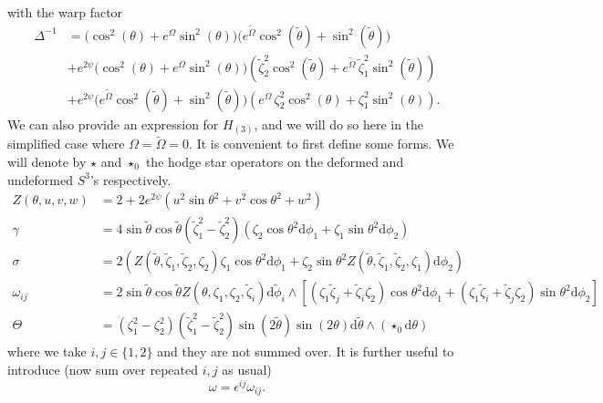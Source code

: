 \documentclass[a4paper, 11pt]{article}
\numberwithin{equation}{section}
\newcommand{\ts}[1]{\widetilde{#1}}
\newcommand{\+}{\oplus}
\renewcommand{\d}{\ensuremath{\mathrm{d}}\xspace}
\begin{document}
with the warp factor
\begin{equation}
	\begin{aligned}
	\Delta^{-1} &= \Big(\cos^{2}(\theta)+e^{\Omega}\sin^{2}(\theta)\Big)\Big(e^{\ts{\Omega}}\cos^{2}(\ts{\theta})+\sin^{2}(\ts{\theta})\Big)\\
	&+e^{2\psi}\Big(\cos^{2}(\theta)+e^{\Omega}\sin^{2}(\theta)\Big)\left(\ts{\zeta}_{2}^{2}\cos^{2}(\ts{\theta})+e^{\ts{\Omega}}\,\ts{\zeta}_{1}^{2}\sin^{2}(\ts{\theta})\right)\\
	&+e^{2\psi}\Big(e^{\ts{\Omega}}\cos^{2}(\ts{\theta})+\sin^{2}(\ts{\theta})\Big)\left(e^{\Omega}\,\zeta_{2}^{2}\cos^{2}(\theta)+\zeta_{1}^{2}\sin^{2}(\theta)\right).
	\end{aligned}
\end{equation}
We can also provide an expression for $H_{(3)}$, and we will do so here in the simplified case where $\Omega=\tilde\Omega=0$. It is convenient to first define some forms. We will denote by $\star$ and $\star_0$ the hodge star operators on the deformed and undeformed $S^3$'s respectively.
\begin{equation}\label{eq:forms}
	\begin{split}
		Z(\theta,u,v,w)&=2+2e^{2\psi}(u^2\sin \theta^2+v^2\cos \theta^2+w^2)\\
		\gamma&=4\sin\tilde\theta\cos\tilde \theta(\tilde{\zeta}_1^2-\tilde{\zeta}_2 ^2)\left(\zeta_2\cos \theta ^2\d \phi _1+\zeta _1\sin\theta ^2\d\phi _2\right)\\
		\sigma&=2\left(	Z(\tilde\theta,\tilde{\zeta}_1,\tilde{\zeta}_2,\zeta_2)\zeta_1\cos \theta ^2\d \phi _1+\zeta _2\sin\theta ^2Z(\tilde\theta,\tilde{\zeta}_1,\tilde{\zeta}_2,\zeta_1)\d\phi _2\right)\\
		\omega_{ij} &=2\sin\tilde\theta \cos\tilde\theta Z(\theta,\zeta_1,\zeta_2,\tilde\zeta _i)\d \tilde \phi _i\wedge \left [(\zeta _1\tilde \zeta _j + \tilde \zeta _i \zeta _2)\cos \theta ^2 \d \phi_1+ (\zeta _1\tilde \zeta _i + \tilde \zeta _j \zeta _2)\sin \theta ^2 \d \phi_2\right]\\
		\Theta&=(\zeta _1^2-\zeta_2 ^2)(\tilde{\zeta}_1 ^2-\tilde \zeta _2^2)\sin(2\tilde\theta ) \sin (2 \theta)\d\tilde \theta\wedge(\star_0\d\theta)
	\end{split}
\end{equation}
where we take $i,j\in\{1,2\}$ and they are not summed over. It is further useful to introduce (now sum over repeated $i,j$ as usual)
\begin{equation}\label{eq:omegagamma}
 \omega=\epsilon^{ij}\omega _{ij}.
\end{equation}
\end{document}
